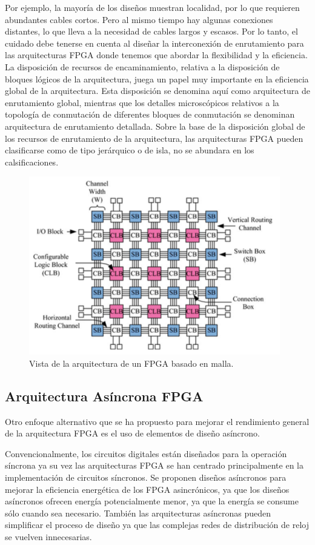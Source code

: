 \documentclass[12pt]{article}
\begin{document}
Por ejemplo, la mayoría de los diseños muestran localidad, por lo que requieren abundantes cables cortos. Pero al mismo tiempo hay algunas conexiones distantes, lo que lleva a la necesidad de cables largos y escasos. Por lo tanto, el cuidado debe tenerse en cuenta al diseñar la interconexión de enrutamiento para las arquitecturas FPGA donde tenemos que abordar la flexibilidad y la eficiencia. La disposición de recursos de encaminamiento, relativa a la disposición de bloques lógicos de la arquitectura, juega un papel muy importante en la eficiencia global de la arquitectura. Esta disposición se denomina aquí como arquitectura de enrutamiento global, mientras que los detalles microscópicos relativos a la topología de conmutación de diferentes bloques de conmutación se denominan arquitectura de enrutamiento detallada. Sobre la base de la disposición global de los recursos de enrutamiento de la arquitectura, las arquitecturas FPGA pueden clasificarse como de tipo jerárquico o de isla, no se abundara en los calsificaciones.

\begin{figure}[H]
  \centering
  \includegraphics[]{4-Overview-of-mesh-based-FPGA-architecture.png}
  \caption{Vista de la arquitectura de un FPGA basado en malla.}
  \label{fig:4}
\end{figure}

\subsection{Arquitectura Asíncrona FPGA}

Otro enfoque alternativo que se ha propuesto para mejorar el rendimiento general de la arquitectura FPGA es el uso de elementos de diseño asíncrono.

Convencionalmente, los circuitos digitales están diseñados para la operación síncrona ya su vez las arquitecturas FPGA se han centrado principalmente en la implementación de circuitos síncronos. Se proponen diseños asíncronos para mejorar la eficiencia energética de los FPGA asincrónicos, ya que los diseños asíncronos ofrecen energía potencialmente menor, ya que la energía se consume sólo cuando sea necesario. También las arquitecturas asíncronas pueden simplificar el proceso de diseño ya que las complejas redes de distribución de reloj se vuelven innecesarias.
\end{document}

